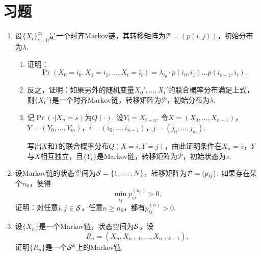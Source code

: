 \section{习题}

\begin{enumerate}[wide, labelindent=0pt]

    \item \label{exercise:Markov-property} 设$\{X_t\}_{t=0}^{\infty}$是一个时齐Markov链，其转移矩阵为$\mathcal P=(p(i,j))$，初始分布为$\lambda$.
    \begin{enumerate}
        \item 证明：
        \[\Pr(X_0=i_0,X_1=i_1,\dots,X_t=i_t)=\lambda_{i_0}\cdot p(i_0,i_1)\dots p(i_{t-1},i_t).\]
        \item 反之，证明：如果另外的随机变量$X_0',\dots,X_t'$的联合概率分布满足上式，则$\{X_t'\}$是一个时齐Markov链，转移矩阵为$\mathcal P$，初始分布为$\lambda$.
        \item 记$\Pr(\cdot|X_n=s)$为$Q(\cdot)$. 设$Y_t=X_{t+n}$. 令$X=(X_0,\dots, X_{n-1})$，$Y=(Y_0,\dots,Y_m)$，$i=(i_0,\dots,i_{n-1})$，$j=(j_0,\dots,j_{m})$. 
        
        写出$X$和$Y$的联合概率分布$Q(X=i,Y=j)$，由此证明条件在$X_{n}=s$，$Y$与$X$相互独立，且$\{Y_t\}$是Markov链，转移矩阵为$\mathcal P$，初始状态为$s$.
    \end{enumerate}

    \item \label{exercise:ergodic} 设Markov链的状态空间为$\mathcal S=\{1,\dots,N\}$，转移矩阵为$\mathcal P=(p_{ij})$. 如果存在某个$n_0$，使得
    \[
        \min_{ij}p_{ij}^{(n_0)}>0,
    \]
    证明：对任意$i,j\in\mathcal S$，任意$n\geq n_0$，都有$p_{ij}^{(n)}>0$.

    \item \label{exercise:MDP-k-step} 设$\{X_n\}$是一个Markov链，状态空间为$\mathcal S$，设
    \[R_{n}=(X_n,X_{n+1},\dots,X_{n+k-1}),\]
    证明$\{R_n\}$是一个$\mathcal S^k$上的Markov链.


\end{enumerate}
